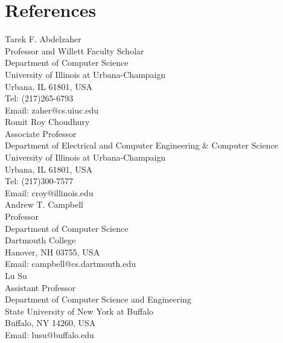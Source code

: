 \section{\sc References}
Tarek F. Abdelzaher\\
Professor and Willett Faculty Scholar\\
Department of Computer Science\\
University of Illinois at Urbana-Champaign\\
Urbana, IL 61801, USA\\
Tel: (217)265-6793\\
Email: zaher@cs.uiuc.edu\\

Romit Roy Choudhury\\
Associate Professor\\
Department of Electrical and Computer Engineering \& Computer Science\\
University of Illinois at Urbana-Champaign\\
Urbana, IL 61801, USA\\
Tel: (217)300-7577\\
Email: croy@illinois.edu\\


Andrew T. Campbell\\
Professor\\
Department of Computer Science\\
Dartmouth College\\
Hanover, NH 03755, USA\\
Email: campbell@cs.dartmouth.edu\\

Lu Su\\
Assistant Professor\\
Department of Computer Science and Engineering\\
State University of New York at Buffalo\\
Buffalo, NY 14260, USA\\
Email: lusu@buffalo.edu\\